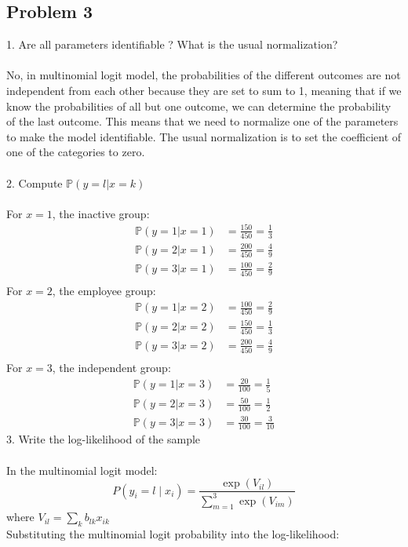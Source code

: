 \documentclass[12pt]{article}
\begin{document}
\begin{flushleft}
\subsection*{Problem 3}
1. Are all parameters identifiable ? What is the usual normalization?\\~\\
No, in multinomial logit model, the probabilities of the different outcomes are not independent from each other because they are set to sum to 1, meaning that if we know the probabilities of all but one outcome, we can determine the probability of the last outcome. This means that we need to normalize one of the parameters to make the model identifiable. The usual normalization is to set the coefficient of one of the categories to zero.\\~\\
2. Compute $\mathbb{P}(y=l | x=k)$\\~\\
For $x=1$, the inactive group:
\begin{align*}
\mathbb{P}(y=1 | x=1) &= \frac{150}{450}=\frac{1}{3}\\
\mathbb{P}(y=2 | x=1) &= \frac{200}{450}=\frac{4}{9}\\
\mathbb{P}(y=3 | x=1) &= \frac{100}{450}=\frac{2}{9}\\
\end{align*}
For $x=2$, the employee group:
\begin{align*}
\mathbb{P}(y=1 | x=2) &= \frac{100}{450}=\frac{2}{9}\\
\mathbb{P}(y=2 | x=2) &= \frac{150}{450}=\frac{1}{3}\\
\mathbb{P}(y=3 | x=2) &= \frac{200}{450}=\frac{4}{9}\\
\end{align*}
For $x=3$, the independent group:
\begin{align*}
\mathbb{P}(y=1 | x=3) &= \frac{20}{100}=\frac{1}{5}\\
\mathbb{P}(y=2 | x=3) &= \frac{50}{100}=\frac{1}{2}\\
\mathbb{P}(y=3 | x=3) &= \frac{30}{100}=\frac{3}{10}
\end{align*}
3. Write the log-likelihood of the sample\\~\\
In the multinomial logit model:
\[
P(y_i = l \mid x_i) = \frac{\exp(V_{il})}{\sum_{m=1}^3 \exp(V_{im})}
\]
where \( V_{il} = \sum_{k} b_{lk} x_{ik} \)\\
Substituting the multinomial logit probability into the log-likelihood:

\end{flushleft}
\end{document}
